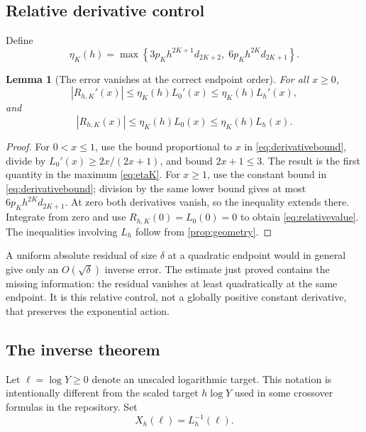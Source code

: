 \documentclass[11pt,a4paper]{article}
\numberwithin{equation}{section}
\newtheorem{lemma}[theorem]{Lemma}
\theoremstyle{definition}
\begin{document}
\subsection{Relative derivative control}
Define
\begin{equation}
\eta_K(h)=\max\left\{
3p_Kh^{2K+1}d_{2K+2},\;
6p_Kh^{2K}d_{2K+1}\right\}.
\label{eq:etaK}
\end{equation}

\begin{lemma}[The error vanishes at the correct endpoint order]
\label{lem:relativeerror}
For all $x\ge0$,
\begin{equation}
|R_{h,K}'(x)|\le\eta_K(h)L_0'(x)
                    \le\eta_K(h)L_h'(x),
\label{eq:relativederiv}
\end{equation}
and
\begin{equation}
|R_{h,K}(x)|\le\eta_K(h)L_0(x)
                    \le\eta_K(h)L_h(x).
\label{eq:relativevalue}
\end{equation}
\end{lemma}
\begin{proof}
For $0<x\le1$, use the bound proportional to $x$ in \eqref{eq:derivativebound}, divide by $L_0'(x)\ge2x/(2x+1)$, and bound $2x+1\le3$. The result is the first quantity in the maximum \eqref{eq:etaK}. For $x\ge1$, use the constant bound in \eqref{eq:derivativebound}; division by the same lower bound gives at most $6p_Kh^{2K}d_{2K+1}$. At zero both derivatives vanish, so the inequality extends there. Integrate from zero and use $R_{h,K}(0)=L_0(0)=0$ to obtain \eqref{eq:relativevalue}. The inequalities involving $L_h$ follow from \cref{prop:geometry}.
\end{proof}

A uniform absolute residual of size $\delta$ at a quadratic endpoint would in general give only an $O(\sqrt\delta)$ inverse error. The estimate just proved contains the missing information: the residual vanishes at least quadratically at the same endpoint. It is this relative control, not a globally positive constant derivative, that preserves the exponential action.

\subsection{The inverse theorem}
Let $\ell=\log Y\ge0$ denote an unscaled logarithmic target. This notation is intentionally different from the scaled target $h\log Y$ used in some crossover formulas in the repository. Set
\[
X_h(\ell)=L_h^{-1}(\ell).
\]
\end{document}
